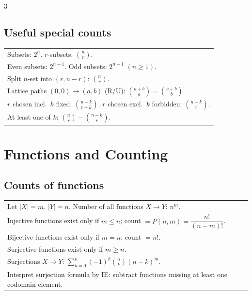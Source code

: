 \documentclass[10pt]{article}
\begin{document}
\begin{multicols*}{3}
\subsection*{Useful special counts}
\vspace{-2pt}
\begin{tabular}{@{}p{}@{}}
Subsets: $2^n$. \quad
$r$-subsets: $\binom{n}{r}$.\\
Even subsets: $2^{n-1}$. \quad
Odd subsets: $2^{n-1}$ $(n\ge1)$.\\
Split $n$-set into $(r,n-r)$: $\binom{n}{r}$.\\
Lattice paths $(0,0)\!\to\!(a,b)$ (R/U): 
$\binom{a+b}{a}=\binom{a+b}{b}$.\\
\vspace{-8pt}
$r$ chosen incl.\ $k$ fixed: $\binom{n-k}{r-k}$. \quad
$r$ chosen excl.\ $k$ forbidden: $\binom{n-k}{r}$.\\
\vspace{-8pt}
At least one of $k$: 
$\binom{n}{r}-\binom{n-k}{r}$.\\
\end{tabular}
\section*{Functions and Counting}

\subsection*{Counts of functions}
\vspace{-1pt}
\begin{tabular}{@{}p{}@{}}
Let $|X|=m$, $|Y|=n$. Number of all functions $X\to Y$: $n^m$.\\
\vspace{-10pt}
Injective functions exist only if $m\le n$; count $=P(n,m)=\dfrac{n!}{(n-m)!}$.\\
\vspace{-10pt}
Bijective functions exist only if $m=n$; count $=n!$.\\
\vspace{-10pt}
Surjective functions exist only if $m\ge n$.\\
\vspace{-8pt}
Surjections $X\to Y$: $ \sum_{k=0}^{n}(-1)^k\binom{n}{k}(n-k)^m$.\\
Interpret surjection formula by IE: subtract functions missing at least one codomain element.\\
\end{tabular}


\end{multicols*}
\end{document}
